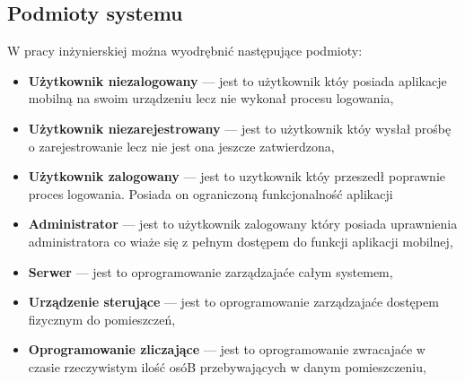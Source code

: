 \subsection{Podmioty systemu} 
W pracy inżynierskiej można wyodrębnić następujące podmioty:
	\begin{itemize}
	\item \textbf{Użytkownik niezalogowany} --- jest to użytkownik któy posiada aplikacje mobilną na swoim urządzeniu lecz nie wykonał procesu logowania,
	\item \textbf{Użytkownik niezarejestrowany} --- jest to użytkownik któy wysłał prośbę o zarejestrowanie lecz nie jest ona jeszcze zatwierdzona,
	\item \textbf{Użytkownik zalogowany} --- jest to uzytkownik któy przeszedł poprawnie proces logowania. Posiada on ograniczoną funkcjonalność aplikacji
	\item \textbf{Administrator} --- jest to użytkownik zalogowany który posiada uprawnienia administratora co wiaże się z pełnym dostępem do funkcji aplikacji mobilnej,
	\item \textbf{Serwer} --- jest to oprogramowanie zarządzajaće całym systemem,
	\item \textbf{Urządzenie sterujące} --- jest to oprogramowanie zarządzajaće dostępem fizycznym do pomieszczeń,
	\item \textbf{Oprogramowanie zliczające} --- jest to oprogramowanie zwracajaće w czasie rzeczywistym ilość osóB przebywających w danym pomieszczeniu,
\end{itemize}